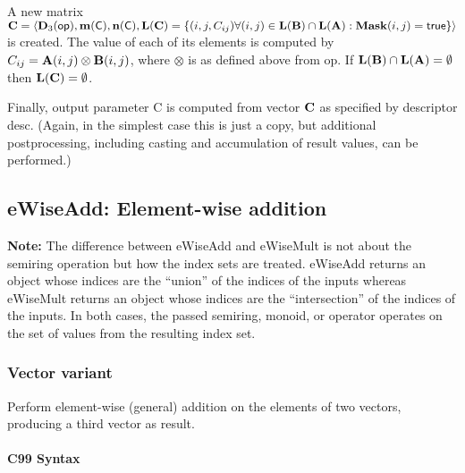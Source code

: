 A new matrix ${\bf C} = \langle \bold{D}_3({\sf op}), \bold{m}({\bf \sf C}),
\bold{n}({\bf \sf C}), \bold{L}({\bf C}) = \{(i,j,C_{ij})  \forall (i,j) \in
\bold{L}({\bf B}) \cap \bold{L}({\bf A}) : {\bf Mask}(i,j)
= {\sf true} \} \rangle$ is created.  The value of each of its
elements is computed by $C_{ij} = {\bf A}(i,j) \otimes {\bf B}(i,j)$,
where $\otimes$ is as defined above from {\sf op}.
If $\bold{L}({\bf B}) \cap \bold{L}({\bf A}) = \emptyset$
then $\bold{L}({\bf C}) = \emptyset$.

Finally, output parameter {\sf C} is computed from vector ${\bf C}$
as specified by descriptor {\sf desc}. (Again, in the simplest case this
is just a copy, but additional postprocessing, including casting and
accumulation of result values, can be performed.) 



\subsection{{\sf eWiseAdd}: Element-wise addition}

{\bf Note:} The difference between {\sf eWiseAdd} and {\sf eWiseMult} is not about the semiring operation but how the index sets are treated.
 {\sf eWiseAdd} returns an object whose indices are the ``union'' of the indices of the inputs whereas  
 {\sf eWiseMult} returns an object whose indices are the ``intersection'' of the indices of the inputs. In both cases, the passed semiring, monoid, or operator operates on the 
 set of values from the resulting index set. 

\subsubsection{Vector variant}

Perform element-wise (general) addition on the elements of two vectors,
producing a third vector as result.

\paragraph{C99 Syntax}

